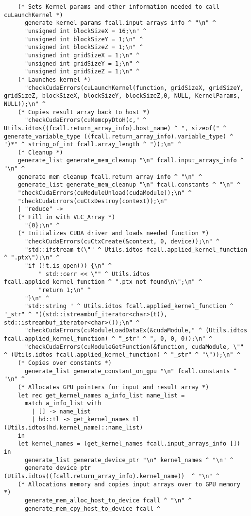 \begin{verbatim}
    (* Sets Kernel params and other information needed to call cuLaunchKernel *)
      generate_kernel_params fcall.input_arrays_info ^ "\n" ^
      "unsigned int blockSizeX = 16;\n" ^ 
      "unsigned int blockSizeY = 1;\n" ^
      "unsigned int blockSizeZ = 1;\n" ^
      "unsigned int gridSizeX = 1;\n" ^
      "unsigned int gridSizeY = 1;\n" ^
      "unsigned int gridSizeZ = 1;\n" ^
    (* Launches kernel *)
      "checkCudaErrors(cuLaunchKernel(function, gridSizeX, gridSizeY, gridSizeZ, blockSizeX, blockSizeY, blockSizeZ,0, NULL, KernelParams, NULL));\n" ^
    (* Copies result array back to host *)
      "checkCudaErrors(cuMemcpyDtoH(c," ^ Utils.idtos((fcall.return_array_info).host_name) ^ ", sizeof(" ^ generate_variable_type ((fcall.return_array_info).variable_type) ^ ")*" ^ string_of_int fcall.array_length ^ "));\n" ^ 
    (* Cleanup *)
    generate_list generate_mem_cleanup "\n" fcall.input_arrays_info ^ "\n" ^ 
    generate_mem_cleanup fcall.return_array_info ^ "\n" ^ 
    generate_list generate_mem_cleanup "\n" fcall.constants ^ "\n" ^
    "checkCudaErrors(cuModuleUnload(cudaModule));\n" ^ 
    "checkCudaErrors(cuCtxDestroy(context));\n"
    | "reduce" ->
    (* Fill in with VLC_Array *)
      "{0};\n" ^ 
    (* Initializes CUDA driver and loads needed function *)
      "checkCudaErrors(cuCtxCreate(&context, 0, device));\n" ^ 
      "std::ifstream t(\"" ^ Utils.idtos fcall.applied_kernel_function ^ ".ptx\");\n" ^ 
      "if (!t.is_open()) {\n" ^
          " std::cerr << \"" ^ Utils.idtos fcall.applied_kernel_function ^ ".ptx not found\n\";\n" ^
          "return 1;\n" ^
      "}\n" ^
      "std::string " ^ Utils.idtos fcall.applied_kernel_function ^ "_str" ^ "((std::istreambuf_iterator<char>(t)), std::istreambuf_iterator<char>());\n" ^ 
      "checkCudaErrors(cuModuleLoadDataEx(&cudaModule," ^ (Utils.idtos fcall.applied_kernel_function) ^ "_str" ^ ", 0, 0, 0));\n" ^ 
      "checkCudaErrors(cuModuleGetFunction(&function, cudaModule, \"" ^ (Utils.idtos fcall.applied_kernel_function) ^ "_str" ^ "\"));\n" ^ 
    (* Copies over constants *)
      generate_list generate_constant_on_gpu "\n" fcall.constants ^ "\n" ^
    (* Allocates GPU pointers for input and result array *)
    let rec get_kernel_names a_info_list name_list = 
      match a_info_list with 
        | [] -> name_list 
        | hd::tl -> get_kernel_names tl (Utils.idtos(hd.kernel_name)::name_list) 
    in
    let kernel_names = (get_kernel_names fcall.input_arrays_info []) in
      generate_list generate_device_ptr "\n" kernel_names ^ "\n" ^ 
      generate_device_ptr (Utils.idtos((fcall.return_array_info).kernel_name))  ^ "\n" ^
    (* Allocations memory and copies input arrays over to GPU memory *)
      generate_mem_alloc_host_to_device fcall ^ "\n" ^
      generate_mem_cpy_host_to_device fcall ^


\end{verbatim}
